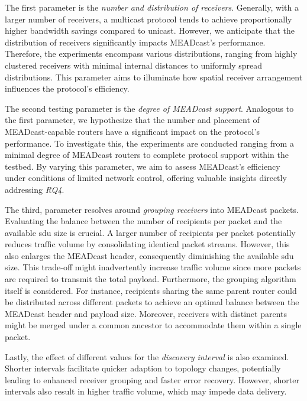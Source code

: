The first parameter is the \textit{number and distribution of receivers}.
Generally, with a larger number of receivers, a multicast protocol tends to
    achieve proportionally higher bandwidth savings compared to unicast.
However, we anticipate that the distribution of receivers significantly impacts
    MEADcast's performance.
Therefore, the experiments encompass various distributions, ranging from highly
    clustered receivers with minimal internal distances to uniformly spread
    distributions.
This parameter aims to illuminate how spatial receiver arrangement influences
    the protocol's efficiency.

The second testing parameter is the \textit{degree of MEADcast support}.
Analogous to the first parameter, we hypothesize that the number and placement
    of MEADcast-capable routers have a significant impact on the protocol's
    performance.
To investigate this, the experiments are conducted ranging from a minimal
    degree of MEADcast routers to complete protocol support within the testbed.
By varying this parameter, we aim to assess MEADcast's efficiency under
    conditions of limited network control, offering valuable insights
    directly addressing \textit{RQ4}.

The third, parameter resolves around \textit{grouping receivers} into MEADcast
    packets.
Evaluating the balance between the number of recipients per packet and the
    available \gls{sdu} size is crucial.
A larger number of recipients per packet potentially reduces traffic volume by
    consolidating identical packet streams.
However, this also enlarges the MEADcast header, consequently diminishing the
    available \gls{sdu} size.
This trade-off might inadvertently increase traffic volume since more packets
    are required to transmit the total payload.
Furthermore, the grouping algorithm itself is considered.
For instance, recipients sharing the same parent router could be distributed
    across different packets to achieve an optimal balance between the MEADcast
    header and payload size.
Moreover, receivers with distinct parents might be merged under a common
    ancestor to accommodate them within a single packet.

Lastly, the effect of different values for the \textit{discovery interval} is
    also examined.
Shorter intervals facilitate quicker adaption to topology changes,
    potentially leading to enhanced receiver grouping and faster error
    recovery.
However, shorter intervals also result in higher traffic volume, which may
    impede data delivery.

